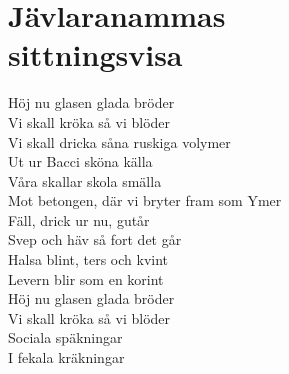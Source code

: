 \section{Jävlaranammas \\sittningsvisa}
Höj nu glasen glada bröder\\
Vi skall kröka så vi blöder\\
Vi skall dricka såna ruskiga volymer\\
Ut ur Bacci sköna källa\\
Våra skallar skola smälla\\
Mot betongen, där vi bryter fram som Ymer\\
Fäll, drick ur nu, gutår\\
Svep och häv så fort det går\\
Halsa blint, ters och kvint\\
Levern blir som en korint\\
Höj nu glasen glada bröder\\
Vi skall kröka så vi blöder\\
Sociala späkningar\\
I fekala kräkningar\\
